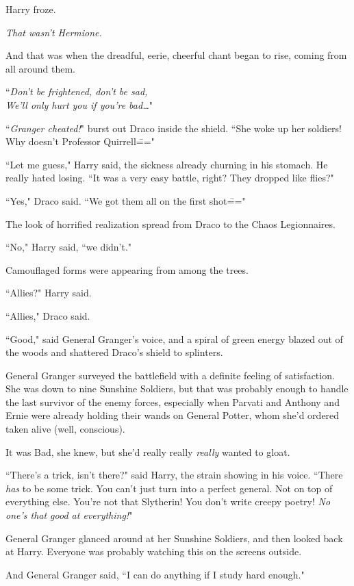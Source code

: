 Harry froze.

\emph{That wasn't Hermione.}

And that was when the dreadful, eerie, cheerful chant began to rise, coming from all around them.

``\emph{Don't be frightened, don't be sad,\\
We'll only hurt you if you're bad{\ldots}}"

``\emph{Granger cheated!}" burst out Draco inside the shield. ``She woke up her soldiers! Why doesn't Professor Quirrell\==="

``Let me guess," Harry said, the sickness already churning in his stomach. He really hated losing. ``It was a very easy battle, right? They dropped like flies?"

``Yes," Draco said. ``We got them all on the first shot\==="

The look of horrified realization spread from Draco to the Chaos Legionnaires.

``No," Harry said, ``we didn't."

Camouflaged forms were appearing from among the trees.

``Allies?" Harry said.

``Allies," Draco said.

``Good," said General Granger's voice, and a spiral of green energy blazed out of the woods and shattered Draco's shield to splinters.

\later

General Granger surveyed the battlefield with a definite feeling of satisfaction. She was down to nine Sunshine Soldiers, but that was probably enough to handle the last survivor of the enemy forces, especially when Parvati and Anthony and Ernie were already holding their wands on General Potter, whom she'd ordered taken alive (well, conscious).

It was Bad, she knew, but she'd really really \emph{really} wanted to gloat.

``There's a trick, isn't there?" said Harry, the strain showing in his voice. ``There \emph{has} to be some trick. You can't just turn into a perfect general. Not on top of everything else. You're not that Slytherin! You don't write creepy poetry! \emph{No one's that good at everything!}"

General Granger glanced around at her Sunshine Soldiers, and then looked back at Harry. Everyone was probably watching this on the screens outside.

And General Granger said, ``I can do anything if I study hard enough."

